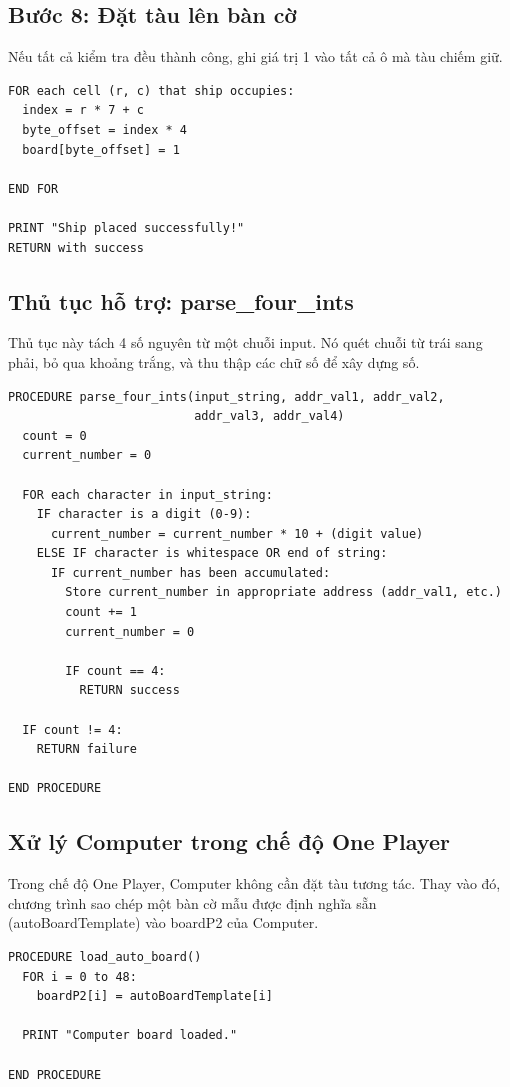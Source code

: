 \subsection{Bước 8: Đặt tàu lên bàn cờ}

Nếu tất cả kiểm tra đều thành công, ghi giá trị 1 vào tất cả ô mà tàu chiếm giữ.

\begin{verbatim}
FOR each cell (r, c) that ship occupies:
  index = r * 7 + c
  byte_offset = index * 4
  board[byte_offset] = 1

END FOR

PRINT "Ship placed successfully!"
RETURN with success
\end{verbatim}

\subsection{Thủ tục hỗ trợ: parse\_four\_ints}

Thủ tục này tách 4 số nguyên từ một chuỗi input. Nó quét chuỗi từ trái sang phải, bỏ qua khoảng trắng, và thu thập các chữ số để xây dựng số.

\begin{verbatim}
PROCEDURE parse_four_ints(input_string, addr_val1, addr_val2, 
                          addr_val3, addr_val4)
  count = 0
  current_number = 0
  
  FOR each character in input_string:
    IF character is a digit (0-9):
      current_number = current_number * 10 + (digit value)
    ELSE IF character is whitespace OR end of string:
      IF current_number has been accumulated:
        Store current_number in appropriate address (addr_val1, etc.)
        count += 1
        current_number = 0
        
        IF count == 4:
          RETURN success
  
  IF count != 4:
    RETURN failure

END PROCEDURE
\end{verbatim}

\subsection{Xử lý Computer trong chế độ One Player}

Trong chế độ One Player, Computer không cần đặt tàu tương tác. Thay vào đó, chương trình sao chép một bàn cờ mẫu được định nghĩa sẵn (autoBoardTemplate) vào boardP2 của Computer.

\begin{verbatim}
PROCEDURE load_auto_board()
  FOR i = 0 to 48:
    boardP2[i] = autoBoardTemplate[i]
  
  PRINT "Computer board loaded."

END PROCEDURE
\end{verbatim}

